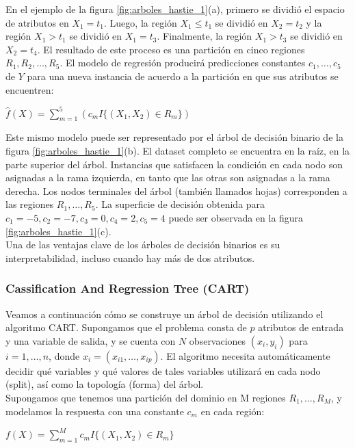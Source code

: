 En el ejemplo de la figura  \ref{fig:arboles_hastie_1}(a), primero se dividió el espacio de atributos en $X_1 = t_1$. Luego, la región $X_1 \leq t_1$ se dividió en $X_2 = t_2$ y la región $X_1 > t_1$ se dividió en $X_1 = t_3$. Finalmente, la región $X_1 > t_3$ se dividió en $X_2 = t_4$. El resultado de este proceso es una partición en cinco regiones $R_1, R_2, \ldots, R_5$. El modelo de regresión producirá predicciones constantes $c_1, \ldots, c_5$ de $Y$ para una nueva instancia de acuerdo a la partición en que sus atributos se encuentren:

\begin{center}
$\hat{f}(X) = \sum\limits_{m=1}^5 ( c_m I\{(X_1,X_2) \in R_m\} )$
\end{center}

Este mismo modelo puede ser representado por el árbol de decisión binario de la figura \ref{fig:arboles_hastie_1}(b). El dataset completo se encuentra en la raíz, en la parte superior del árbol. Instancias que satisfacen la condición en cada nodo son asignadas a la rama izquierda, en tanto que las otras son asignadas a la rama derecha. Los nodos terminales del árbol (también llamados hojas) corresponden a las regiones $R_1, \ldots, R_5$. La superficie de decisión obtenida para $c_1=-5, c_2=-7, c_3=0, c_4=2, c_5=4$ puede ser observada en la figura \ref{fig:arboles_hastie_1}(c). \\

Una de las ventajas clave de los árboles de decisión binarios es su interpretabilidad, incluso cuando hay más de dos atributos.

\subsubsection{Cassification And Regression Tree (CART)}
\label{cart}
Veamos a continuación cómo se construye un árbol de decisión utilizando el algoritmo CART. Supongamos que el problema consta de $p$ atributos de entrada y una variable de salida, y se cuenta con $N$ observaciones $(x_i,y_i)$ para $i=1,\ldots,n$, donde $x_i=(x_{i1},\ldots, x_{ip})$. El algoritmo necesita automáticamente decidir qué variables y qué valores de tales variables utilizará en cada nodo (split), así como la topología (forma) del árbol. \\

Supongamos que tenemos una partición del dominio en M regiones $R_1, \ldots, R_M$, y modelamos la respuesta con una constante $c_m$ en cada región:

\begin{center}
$f(X) = \sum\limits_{m=1}^M c_m I\{(X_1,X_2) \in R_m\}$
\end{center}

